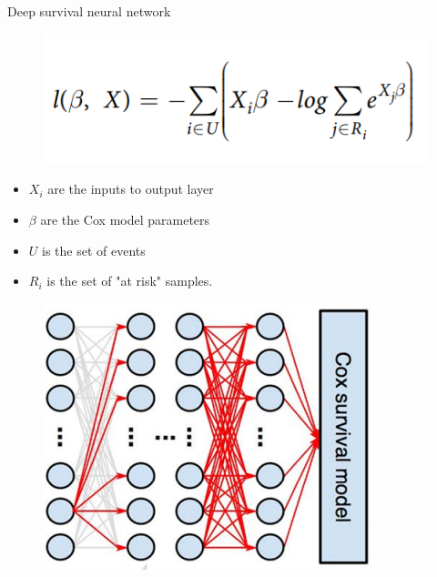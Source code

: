 \documentclass[
]{beamer}
\begin{document}
\begin{frame}[plain]{Deep survival neural network}
\begin{figure}
	\centering
	\includegraphics[scale=0.5]{loglik1}
\end{figure}
\begin{itemize}
	\item $X_i$ are the inputs to output layer
	\item $\beta$ are the Cox model parameters
	\item $U$ is the set of events
	\item $R_i$ is the set of "at risk" samples.
\end{itemize}
\begin{figure}
	\includegraphics[scale=0.5]{nn2}
\end{figure}
\end{frame}
\end{document}
